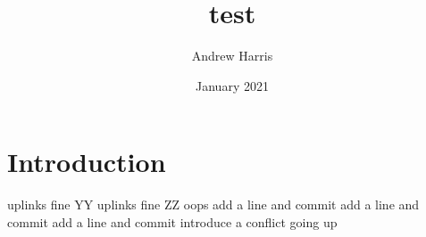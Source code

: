 \documentclass{article}
\title{test}
\author{Andrew Harris}
\date{January 2021}
\begin{document}
\maketitle

\section{Introduction}
uplinks fine YY
uplinks fine ZZ
oops
add a line and commit
add a line and commit
add a line and commit
introduce a conflict going up
\end{document}
